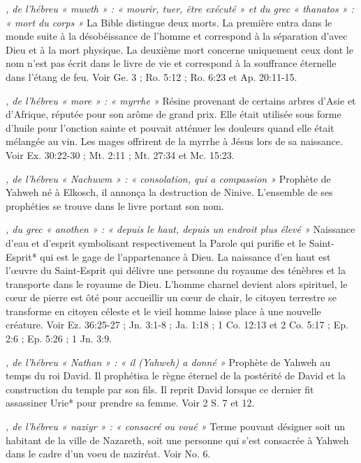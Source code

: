 \begin{multicols}{2}
\textit{, de l'hébreu « muwth » : « mourir, tuer, être exécuté » et du grec « thanatos » : « mort du corps »}\newline
La Bible distingue deux morts. La première entra dans le monde suite à la désobéissance de l'homme et correspond à la séparation d'avec Dieu et à la mort physique. La deuxième mort concerne uniquement ceux dont le nom n'est pas écrit dans le livre de vie et correspond à la souffrance éternelle dans l'étang de feu. Voir Ge. 3 ; Ro. 5:12 ; Ro. 6:23 et Ap. 20:11-15.

\textit{, de l'hébreu « more » : « myrrhe »}\newline
Résine provenant de certains arbres d'Asie et d'Afrique, réputée pour son arôme de grand prix. Elle était utilisée sous forme d'huile pour l'onction sainte et pouvait atténuer les douleurs quand elle était mélangée au vin. Les mages offrirent de la myrrhe à Jésus lors de sa naissance. Voir Ex. 30:22-30 ; Mt. 2:11 ; Mt. 27:34 et Mc. 15:23.

\textit{, de l'hébreu « Nachuwm » : « consolation, qui a compassion »}\newline
Prophète de Yahweh né à Elkosch, il annonça la destruction de Ninive. L'ensemble de ses prophéties se trouve dans le livre portant son nom.

\textit{, du grec « anothen » : « depuis le haut, depuis un endroit plus élevé »}\newline
Naissance d'eau et d'esprit symbolisant respectivement la Parole qui purifie et le Saint-Esprit* qui est le gage de l'appartenance à Dieu. La naissance d'en haut est l'œuvre du Saint-Esprit qui délivre une personne du royaume des ténèbres et la transporte dans le royaume de Dieu. L'homme charnel devient alors spirituel, le cœur de pierre est ôté pour accueillir un cœur de chair, le citoyen terrestre se transforme en citoyen céleste et le vieil homme laisse place à une nouvelle créature. Voir Ez. 36:25-27 ; Jn. 3:1-8 ; Ja. 1:18 ; 1 Co. 12:13 et 2 Co. 5:17 ; Ep. 2:6 ; Ep. 5:26 ; 1 Jn. 3:9.

\textit{, de l'hébreu « Nathan » : « il (Yahweh) a donné »}\newline
Prophète de Yahweh au temps du roi David. Il prophétisa le règne éternel de la postérité de David et la construction du temple par son fils. Il reprit David lorsque ce dernier fit assassiner Urie* pour prendre sa femme. Voir 2 S. 7 et 12.

\textit{, de l'hébreu « naziyr » : « consacré ou voué »}\newline
Terme pouvant désigner soit un habitant de la ville de Nazareth, soit une personne qui s'est consacrée à Yahweh dans le cadre d'un voeu de naziréat. Voir No. 6.


\end{multicols}
